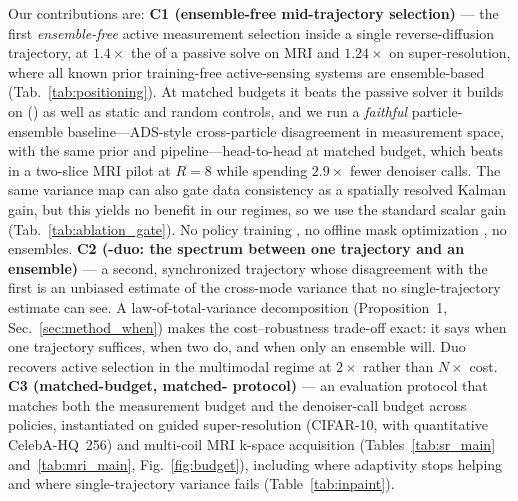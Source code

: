 Our contributions are: \textbf{C1 (ensemble-free mid-trajectory
selection)} --- the first \emph{ensemble-free} active measurement selection
inside a single reverse-diffusion trajectory, at $1.4\times$ the \nfe{} of a
passive solve on MRI and $1.24\times$ on super-resolution, where all known
prior training-free active-sensing systems
\cite{elata2024adasense,nolan2025ads,barba2025dal,iollo2025bedmri,gu2025gsc,christoffel2026dps}
are ensemble-based (Tab.~\ref{tab:positioning}). At matched budgets it beats
the passive solver it builds on (\pigdm) as well as static and random
controls, and we run a \emph{faithful} particle-ensemble
baseline---ADS-style cross-particle disagreement in measurement space, with
the same prior and pipeline---head-to-head at matched budget, which \pvas{}
beats in a two-slice MRI pilot at $R{=}8$ while spending $2.9\times$ fewer
denoiser calls. The same variance map can also gate data consistency as a
spatially resolved Kalman gain, but this yields no benefit in our regimes,
so we use the standard scalar gain (Tab.~\ref{tab:ablation_gate}). No policy
training \cite{zhang2019active,pineda2020rl,bakker2020greedy,yin2021seqmri},
no offline mask optimization \cite{bahadir2019loupe,ravula2023masks}, no
ensembles. \textbf{C2 (\pvas{}-duo: the spectrum between one trajectory and
an ensemble)} --- a second, synchronized trajectory whose disagreement with
the first is an unbiased estimate of the cross-mode variance that no
single-trajectory estimate can see. A law-of-total-variance decomposition
(Proposition~1, Sec.~\ref{sec:method_when}) makes the cost--robustness
trade-off exact: it says when one trajectory suffices, when two do, and when
only an ensemble will. Duo recovers active selection in the multimodal
regime at $2\times$ rather than $N\times$ cost. \textbf{C3 (matched-budget,
matched-\nfe{} protocol)} --- an evaluation protocol that matches both the
measurement budget and the denoiser-call budget across policies,
instantiated on guided super-resolution (CIFAR-10, with quantitative
CelebA-HQ~256) and multi-coil MRI k-space acquisition
(Tables~\ref{tab:sr_main} and~\ref{tab:mri_main}, Fig.~\ref{fig:budget}),
including where adaptivity stops helping \cite{bakker2022multicoil} and
where single-trajectory variance fails (Table~\ref{tab:inpaint}).
